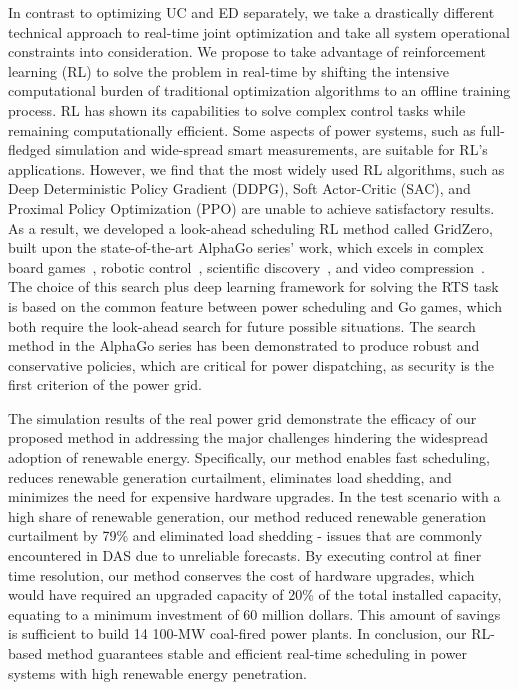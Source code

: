 In contrast to optimizing UC and ED separately, we take a drastically different technical approach to real-time joint optimization and take all system operational constraints into consideration.
We propose to take advantage of reinforcement learning (RL) to solve the problem in real-time by shifting the intensive computational burden of traditional optimization algorithms to an offline training process. 
RL has shown its capabilities to solve complex control tasks while remaining computationally efficient\cite{mnih2015human,lillicrap2015continuous,haarnoja2018soft,schulman2017proximal,silver2016mastering}. Some aspects of power systems, such as full-fledged simulation and wide-spread smart measurements, are suitable for RL's applications.
However, we find that the most widely used RL algorithms, such as Deep Deterministic Policy Gradient (DDPG)\cite{lillicrap2015continuous}, Soft Actor-Critic (SAC)\cite{haarnoja2018soft}, and Proximal Policy Optimization (PPO)\cite{schulman2017proximal} are unable to achieve satisfactory results. As a result, we developed a look-ahead scheduling RL method called GridZero, built upon the state-of-the-art AlphaGo series' work, which excels in complex board games~\cite{silver2016mastering,li2018alphago,silver2017mastering,schrittwieser2020mastering}, robotic control~\cite{hubert2021learning}, scientific discovery~\cite{fawzi2022discovering}, and video compression~\cite{mandhane2022muzero}.
The choice of this search plus deep learning framework for solving the RTS task is based on the common feature between power scheduling and Go games, which both require the look-ahead search for future possible situations. The search method in the AlphaGo series has been demonstrated to produce robust and conservative policies, which are critical for power dispatching, as security is the first criterion of the power grid. 


The simulation results of the real power grid demonstrate the efficacy of our proposed method in addressing the major challenges hindering the widespread adoption of renewable energy. Specifically, our method enables fast scheduling, reduces renewable generation curtailment, eliminates load shedding, and minimizes the need for expensive hardware upgrades. In the test scenario with a high share of renewable generation, our method reduced renewable generation curtailment by 79\% and eliminated load shedding - issues that are commonly encountered in DAS due to unreliable forecasts. By executing control at finer time resolution, our method conserves the cost of hardware upgrades, which would have required an upgraded capacity of 20\% of the total installed capacity, equating to a minimum investment of 60 million dollars. This amount of savings is sufficient to build 14 100-MW coal-fired power plants. In conclusion, our RL-based method guarantees stable and efficient real-time scheduling in power systems with high renewable energy penetration.


